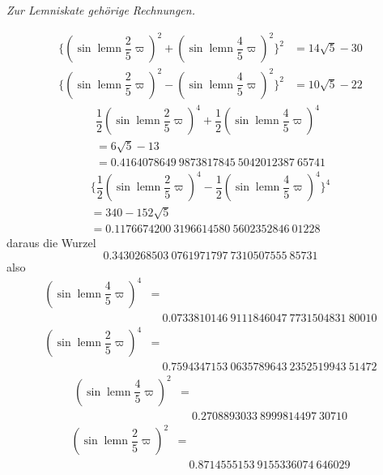 \begin{center}\textit{Zur Lemniskate gehörige Rechnungen.}\end{center}
\[
\begin{aligned}
\{(\sin\operatorname{lemn}\dfrac25\varpi)^2
+(\sin\operatorname{lemn}\dfrac45\varpi)^2\}^2&=14\surd5-30\\[5pt]
\{(\sin\operatorname{lemn}\dfrac25\varpi)^2
-(\sin\operatorname{lemn}\dfrac45\varpi)^2\}^2&=10\surd5-22
\end{aligned}
\]
\[
\begin{gathered}
\dfrac12(\sin\operatorname{lemn}\dfrac25\varpi)^4
+\dfrac12(\sin\operatorname{lemn}\dfrac45\varpi)^4
\\[5pt]=6\surd5-13\\[5pt]
=0.4164078649\ 9873817845\ 5042012387\ 65741
\end{gathered}
\]
\[
\begin{gathered}
\{\dfrac12(\sin\operatorname{lemn}\dfrac25\varpi)^4
-\dfrac12(\sin\operatorname{lemn}\dfrac45\varpi)^4\}^4
\\[5pt]=340-152\surd5\\[5pt]
=0.1176674200\ 3196614580\ 5602352846\ 01228
\end{gathered}
\]
\noindent daraus die Wurzel
\[
0.3430268503\ 0761971797\ 7310507555\ 85731
\]
\noindent also
\[
\begin{aligned}(\sin\operatorname{lemn}\dfrac45\varpi)^4
&=\\[5pt]&\quad{}0.0733810146\ 9111846047\ 7731504831\ 80010\end{aligned}
\]
\[
\begin{aligned}(\sin\operatorname{lemn}\dfrac25\varpi)^4
&=\\[5pt]&\quad{}0.7594347153\ 0635789643\ 2352519943\ 51472\end{aligned}
\]
\[
\begin{aligned}(\sin\operatorname{lemn}\dfrac45\varpi)^2
&=\\[5pt]&\quad{}0.2708893033\ 8999814497\ 30710\end{aligned}
\]
\[
\begin{aligned}(\sin\operatorname{lemn}\dfrac25\varpi)^2
&=\\[5pt]&\quad{}0.8714555153\ 9155336074\ 646029\end{aligned}
\]
